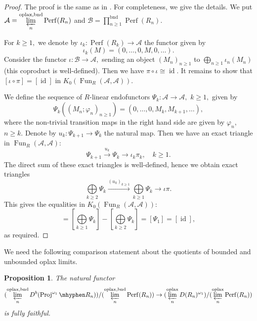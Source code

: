 \documentclass[11pt,leqno]{amsart}
\newtheorem{prop}[theo]{Proposition}
\numberwithin{equation}{section}
\newcommand{\hy}{\mhyphen}
\newcommand{\prolim}[1][]{\mathop{\varprojlim}\limits_{#1}}
\newcommand{\biggplus}[1][]{\mathop{\bigoplus}\limits_{#1}}
\newcommand{\prodd}[1][]{\mathop{\prod}\limits_{#1}}
\newcommand{\xto}{\xrightarrow}
\newcommand{\bnd}{\operatorname{bnd}}
\newcommand{\oplax}{\operatorname{oplax}}
\newcommand{\Proj}{\operatorname{Proj}}
\newcommand{\cA}{{\mathcal A}}
\newcommand{\cB}{{\mathcal B}}
\newcommand{\Fun}{\operatorname{Fun}}
\newcommand{\Perf}{\operatorname{Perf}}
\newcommand{\id}{\operatorname{id}}
\begin{document}
\begin{proof}
The proof is the same as in \cite[Proposition 4.29]{E24}. For completeness, we give the details. We put $\cA=\prolim[n]^{\oplax,\bnd}\Perf(R_n)$ and $\cB=\prodd[n\geq 1]^{\bnd}\Perf(R_n).$

For $k\geq 1,$ we denote by $\iota_k:\Perf(R_k)\to\cA$ the functor given by
\begin{equation*}
\iota_k(M)=(0,\dots,0,M,0,\dots).
\end{equation*} 
Consider the functor $\iota:\cB\to \cA,$ sending an object $(M_n)_{n\geq 1}$ to $\biggplus[n\geq 1]\iota_n(M_n)$ (this coproduct is well-defined). Then we have $\pi\circ\iota\cong \id.$ It remains to show that $[\iota\circ \pi]=[\id]$ in $K_0(\Fun_R(\cA,\cA)).$ 

We define the sequence of $R$-linear endofunctors $\Psi_k:\cA\to\cA,$ $k\geq 1,$ given by
\begin{equation*}
\Psi_k((M_n;\varphi_n)_{n\geq 1})=(0,\dots,0,M_k,M_{k+1},\dots),
\end{equation*} 
where the non-trivial transition maps in the right hand side are given by $\varphi_n,$ $n\geq k.$ Denote by $u_k:\Psi_{k+1}\to\Psi_k$ the natural map. Then we have an exact triangle in $\Fun_R(\cA,\cA):$
\begin{equation*}
\Psi_{k+1}\xto{u_k} \Psi_k\to \iota_k\pi_k,\quad k\geq 1. 
\end{equation*}
The direct sum of these exact triangles is well-defined, hence we obtain exact triangles
\begin{equation*}
\biggplus[k\geq 2]\Psi_k\xto{(u_k)_{k\geq 1}}\biggplus[k\geq 1]\Psi_k\to\iota\pi.
\end{equation*}
This gives the equalities in $K_0(\Fun_R(\cA,\cA)):$
\begin{equation*}
[\iota\circ\pi] = [\biggplus[k\geq 1]\Psi_k] - [\biggplus[k\geq 2]\Psi_k] = [\Psi_1] = [\id],
\end{equation*}
as required.
\end{proof}

We need the following comparison statement about the quotients of bounded and unbounded oplax limits.

\begin{prop}\label{prop:comparison_of_quotients_of_oplax_limits}
The natural functor
\begin{equation*}
(\prolim[n]^{\oplax,\bnd}D^b(\Proj^{\omega_1}\hy R_n))/(\prolim[n]^{\oplax,\bnd}\Perf(R_n))\to (\prolim[n]^{\oplax}D(R_n)^{\omega_1})/(\prolim[n]^{\oplax}\Perf(R_n)) 
\end{equation*}
is fully faithful.
\end{prop}
\end{document}
